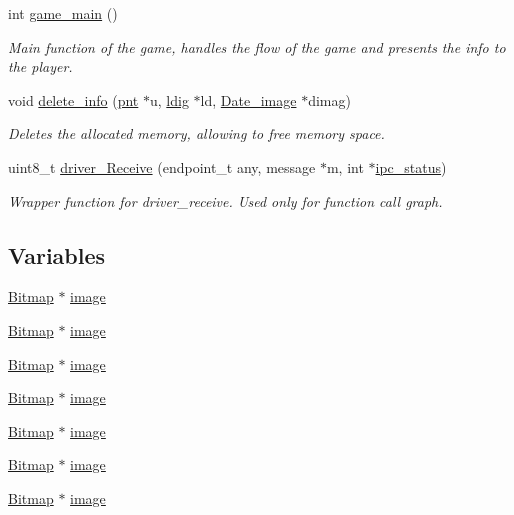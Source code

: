 \begin{DoxyCompactItemize}
int \mbox{\hyperlink{group__game_gaa449f1959d3595ac0d0b88d643b1acd4}{game\+\_\+main}} ()
\begin{DoxyCompactList}\small\item\em Main function of the game, handles the flow of the game and presents the info to the player. \end{DoxyCompactList}\item 
void \mbox{\hyperlink{group__game_gac6c44260c9d002d8a21c4bfd44b2fd88}{delete\+\_\+info}} (\mbox{\hyperlink{structpnt}{pnt}} $\ast$u, \mbox{\hyperlink{structldig}{ldig}} $\ast$ld, \mbox{\hyperlink{struct_date__image}{Date\+\_\+image}} $\ast$dimag)
\begin{DoxyCompactList}\small\item\em Deletes the allocated memory, allowing to free memory space. \end{DoxyCompactList}\item 
uint8\+\_\+t \mbox{\hyperlink{group__game_ga221b757ab658deb87f4ccd865d29a9ff}{driver\+\_\+\+Receive}} (endpoint\+\_\+t any, message $\ast$m, int $\ast$\mbox{\hyperlink{game_8c_ab9f863ebaa3805a6e366e055cd35626a}{ipc\+\_\+status}})
\begin{DoxyCompactList}\small\item\em Wrapper function for driver\+\_\+receive. Used only for function call graph. \end{DoxyCompactList}\end{DoxyCompactItemize}
\subsection*{Variables}
\begin{DoxyCompactItemize}
\item 
\mbox{\hyperlink{struct_bitmap}{Bitmap}} $\ast$ \mbox{\hyperlink{group__game_ga801bef0ab9d72c95bc5d6d6a0d8f2db0}{image}}
\item 
\mbox{\hyperlink{struct_bitmap}{Bitmap}} $\ast$ \mbox{\hyperlink{group__game_ga801bef0ab9d72c95bc5d6d6a0d8f2db0}{image}}
\item 
\mbox{\hyperlink{struct_bitmap}{Bitmap}} $\ast$ \mbox{\hyperlink{group__game_ga801bef0ab9d72c95bc5d6d6a0d8f2db0}{image}}
\item 
\mbox{\hyperlink{struct_bitmap}{Bitmap}} $\ast$ \mbox{\hyperlink{group__game_ga801bef0ab9d72c95bc5d6d6a0d8f2db0}{image}}
\item 
\mbox{\hyperlink{struct_bitmap}{Bitmap}} $\ast$ \mbox{\hyperlink{group__game_ga801bef0ab9d72c95bc5d6d6a0d8f2db0}{image}}
\item 
\mbox{\hyperlink{struct_bitmap}{Bitmap}} $\ast$ \mbox{\hyperlink{group__game_ga801bef0ab9d72c95bc5d6d6a0d8f2db0}{image}}
\item 
\mbox{\hyperlink{struct_bitmap}{Bitmap}} $\ast$ \mbox{\hyperlink{group__game_ga801bef0ab9d72c95bc5d6d6a0d8f2db0}{image}}
\end{DoxyCompactItemize}


